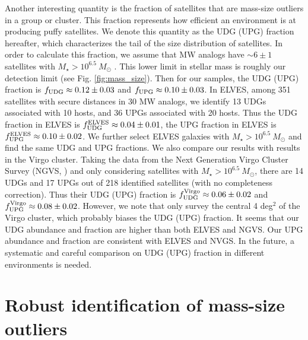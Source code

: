 \documentclass[twocolumn,astrosymb,twocolappendix]{aastex631}
\begin{document}
\begin{CJK*}{UTF8}{gbsn}
Another interesting quantity is the fraction of satellites that are mass-size outliers in a group or cluster. This fraction represents how efficient an environment is at producing puffy satellites. We denote this quantity as the UDG (UPG) fraction hereafter, which characterizes the tail of the size distribution of satellites. In order to calculate this fraction, we assume that MW analogs have $\sim 6 \pm 1$ satellites with $M_\star > 10^{6.5}\ M_\odot$ \citep{CarlstenELVES2022}. This lower limit in stellar mass is roughly our detection limit (see Fig. \ref{fig:mass_size}). Then for our samples, the UDG (UPG) fraction is $f_{\rm UDG} \approx 0.12 \pm 0.03$ and $f_{\rm UPG} \approx 0.10 \pm 0.03$. In ELVES, among 351 satellites with secure distances in 30 MW analogs, we identify 13 UDGs associated with 10 hosts, and 36 UPGs associated with 20 hosts. Thus the UDG fraction in ELVES is $f_{\rm UDG}^{\rm ELVES} \approx 0.04 \pm 0.01$, the UPG fraction in ELVES is $f_{\rm UPG}^{\rm ELVES} \approx 0.10 \pm 0.02$. We further select ELVES galaxies with $M_\star > 10^{6.5}\ M_\odot$ and find the same UDG and UPG fractions. We also compare our results with results in the Virgo cluster. Taking the data from the Next Generation Virgo Cluster Survey (NGVS, \citealt{Ferrarese2020}) and only considering satellites with $M_\star > 10^{6.5}\ M_\odot$, there are 14 UDGs and 17 UPGs out of 218 identified satellites (with no completeness correction). Thus their UDG (UPG) fraction is $f_{\rm UDG}^{\rm Virgo} \approx 0.06\pm 0.02$ and $f_{\rm UPG}^{\rm Virgo} \approx 0.08\pm 0.02$. However, we note that \citet{Ferrarese2020} only survey the central 4 deg$^2$ of the Virgo cluster, which probably biases the UDG (UPG) fraction. It seems that our UDG abundance and fraction are higher than both ELVES and NGVS. Our UPG abundance and fraction are consistent with ELVES and NVGS. In the future, a systematic and careful comparison on UDG (UPG) fraction in different environments is needed. 


\section{Robust identification of mass-size outliers}\label{sec:discussion}



\end{CJK*}
\end{document}

